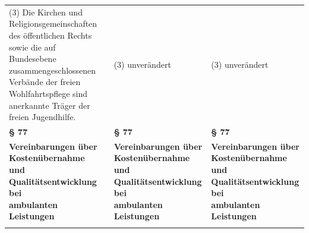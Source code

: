 \documentclass[10pt,a4paper,landscape]{article}
\begin{document}
\begin{longtable}{|L{8.2cm}|L{8.2cm}|L{8.2cm}|}
\hhline{|---|}
(3) Die Kirchen und  \newline Religionsgemeinschaften des öffentlichen  \newline Rechts sowie die auf Bundesebene  \newline zusammengeschlossenen Verbände der  \newline freien Wohlfahrtspflege sind anerkannte  \newline Träger der freien Jugendhilfe. & (3) unverändert & (3) unverändert \\
\hhline{|---|}
\textbf{\S{} 77} & \textbf{\S{} 77} & \textbf{\S{} 77} \\
\hhline{|---|}
\textbf{Vereinbarungen über Kostenübernahme  \newline und Qualitätsentwicklung bei  \newline ambulanten Leistungen} & \textbf{Vereinbarungen über Kostenübernahme  \newline und Qualitätsentwicklung bei  \newline ambulanten Leistungen} & \textbf{Vereinbarungen über Kostenübernahme  \newline und Qualitätsentwicklung bei  \newline ambulanten Leistungen} \\
\hhline{|---|}

\end{longtable}
\end{document}
